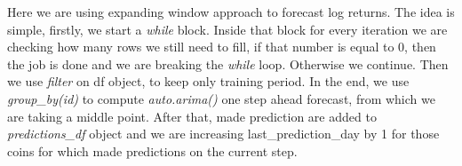\documentclass[
]{article}
\newenvironment{Shaded}{\begin{snugshade}}{\end{snugshade}}
\newcommand{\AttributeTok}[1]{\textcolor[rgb]{0.13,0.29,0.53}{#1}}
\newcommand{\CommentTok}[1]{\textcolor[rgb]{0.56,0.35,0.01}{\textit{#1}}}
\newcommand{\ConstantTok}[1]{\textcolor[rgb]{0.56,0.35,0.01}{#1}}
\newcommand{\ControlFlowTok}[1]{\textcolor[rgb]{0.13,0.29,0.53}{\textbf{#1}}}
\newcommand{\DecValTok}[1]{\textcolor[rgb]{0.00,0.00,0.81}{#1}}
\newcommand{\FunctionTok}[1]{\textcolor[rgb]{0.13,0.29,0.53}{\textbf{#1}}}
\newcommand{\NormalTok}[1]{#1}
\newcommand{\OtherTok}[1]{\textcolor[rgb]{0.56,0.35,0.01}{#1}}
\newcommand{\SpecialCharTok}[1]{\textcolor[rgb]{0.81,0.36,0.00}{\textbf{#1}}}
\newcommand{\StringTok}[1]{\textcolor[rgb]{0.31,0.60,0.02}{#1}}
\begin{document}
Here we are using expanding window approach to forecast log returns. The
idea is simple, firstly, we start a \emph{while} block. Inside that
block for every iteration we are checking how many rows we still need to
fill, if that number is equal to 0, then the job is done and we are
breaking the \emph{while} loop. Otherwise we continue. Then we use
\emph{filter} on df object, to keep only training period. In the end, we
use \emph{group\_by(id)} to compute \emph{auto.arima()} one step ahead
forecast, from which we are taking a middle point. After that, made
prediction are added to \emph{predictions\_df} object and we are
increasing last\_prediction\_day by 1 for those coins for which made
predictions on the current step.

\begin{Shaded}
\end{Shaded}
\end{document}
